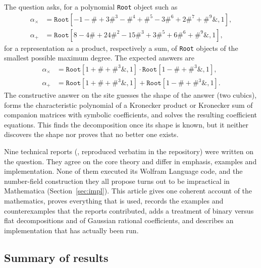 \documentclass[11pt,a4paper]{article}
\theoremstyle{definition}
\theoremstyle{remark}
\newcommand{\code}[1]{\texttt{#1}}
\newcommand{\Root}{\code{Root}}
\begin{document}
The question \cite{question} asks, for a polynomial \Root{} object such as
\begin{equation}\label{eq:examples}
\begin{aligned}
 \alpha_\times&=\Root[-1 - \# + 3 \#^3 - \#^4 + \#^5 - 3 \#^6 + 2 \#^7 + \#^9 \&, 1],\\
 \alpha_+&=\Root[8 - 4 \# + 24 \#^2 - 15 \#^3 + 3 \#^5 + 6 \#^6 + \#^9 \&, 1],
\end{aligned}
\end{equation}
for a representation as a product, respectively a sum, of \Root{} objects of the smallest possible
maximum degree.  The expected answers are
\begin{equation}\label{eq:answers}
\begin{aligned}
 \alpha_\times&=\Root[1+\#+\#^3\&,1]\cdot\Root[1-\#+\#^3\&,1],\\
 \alpha_+&=\Root[1+\#+\#^3\&,1]+\Root[1-\#+\#^3\&,1].
\end{aligned}
\end{equation}
The constructive answer on the site \cite{question} guesses the shape of the answer (two cubics), forms
the characteristic polynomial of a Kronecker product or Kronecker sum of companion matrices with
symbolic coefficients, and solves the resulting coefficient equations.  This finds the decomposition once
its shape is known, but it neither discovers the shape nor proves that no better one exists.

Nine technical reports (\cite{r1,r2,r3,r4,r5,r6,r7,r8,r9}, reproduced verbatim in the repository)
were written on the question.  They agree on the core theory and differ in emphasis, examples and
implementation.  None of them executed its Wolfram Language code, and the number-field construction they
all propose turns out to be impractical in Mathematica (Section~\ref{sec:impl}).  This article gives one
coherent account of the mathematics, proves everything that is used, records the examples and
counterexamples that the reports contributed, adds a treatment of binary versus flat decompositions and
of Gaussian rational coefficients, and describes an implementation that has actually been run.

\subsection{Summary of results}
\end{document}
